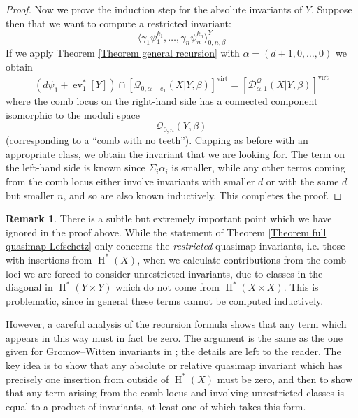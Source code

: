 \documentclass[10pt]{amsart}
\newcommand{\Q}[4]{\mathcal{Q}_{#1,#2}(#3,#4)}
\newcommand{\virt}[1]{[#1]^{\operatorname{virt}}}
\newcommand{\HH}{\operatorname{H}}
\newcommand{\ev}{\operatorname{ev}}
\theoremstyle{definition}
\theoremstyle{definition}
\newtheorem{remark}[thm]{Remark}
\begin{document}
\begin{proof}
Now we prove the induction step for the absolute invariants of $Y$. Suppose then that we want to compute a restricted invariant:
\begin{equation*} \langle \gamma_1 \psi_1^{k_1}, \ldots, \gamma_n \psi_n^{k_n} \rangle_{0,n,\beta}^{Y} \end{equation*}
 If we apply Theorem \ref{Theorem general recursion} with $\alpha=(d+1,0,\ldots,0)$ we obtain
\begin{equation*} (d \psi_1 + \ev_1^* [Y]) \cap \virt{\Q{0}{\alpha-e_1}{X|Y}{\beta}} = \virt{\mathcal D^\mathcal{Q}_{\alpha,1}(X|Y,\beta)} \end{equation*}
where the comb locus on the right-hand side has a connected component isomorphic to the moduli space
\begin{equation*} \Q{0}{n}{Y}{\beta} \end{equation*}
(corresponding to a ``comb with no teeth''). Capping as before with an appropriate class, we obtain the invariant that we are looking for. The term on the left-hand side is known since $\Sigma_i \alpha_i$ is smaller, while any other terms coming from the comb locus either involve invariants with smaller $d$ or with the same $d$ but smaller $n$, and so are also known inductively. This completes the proof. \end{proof}

\begin{remark} There is a subtle but extremely important point which we have ignored in the proof above. While the statement of Theorem \ref{Theorem full quasimap Lefschetz} only concerns the \emph{restricted} quasimap invariants, i.e. those with insertions from $\HH^*(X)$, when we calculate contributions from the comb loci we are forced to consider unrestricted invariants, due to classes in the diagonal in $\HH^*(Y\times Y)$ which do not come from $\HH^*(X\times X)$. This is problematic, since in general these terms cannot be computed inductively.

However, a careful analysis of the recursion formula shows that any term which appears in this way must in fact be zero. The argument is the same as the one given for Gromov--Witten invariants in \cite[\S 2.5]{GathmannThesis}; the details are left to the reader. The key idea is to show that any absolute or relative quasimap invariant which has precisely one insertion from outside of $\HH^*(X)$ must be zero, and then to show that any term arising from the comb locus and involving unrestricted classes is equal to a product of invariants, at least one of which takes this form.\end{remark}
\end{document}
